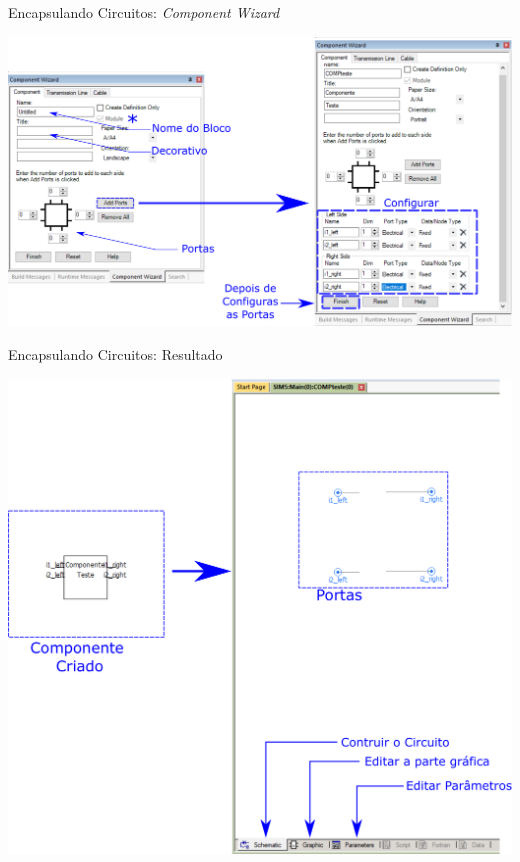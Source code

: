 






\begin{frame}{Encapsulando Circuitos: {\it Component Wizard}}
\centering


\includegraphics[width=0.75\linewidth]{./figuras/Componentes/wizard}


\end{frame}





\begin{frame}{Encapsulando Circuitos: Resultado}
\centering


\includegraphics[width=0.45\linewidth]{./figuras/Componentes/componenteTeste}


\end{frame}




